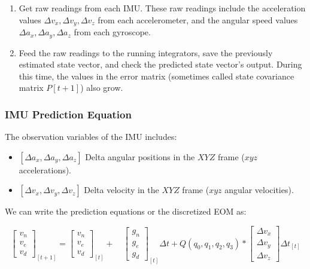 \begin{enumerate}
    \item Get raw readings from each IMU. These raw readings include the acceleration values $\Delta v_x, \Delta v_y, \Delta v_z$ from each accelerometer, and the angular speed values $\Delta a_x, \Delta a_y, \Delta a_z$ from each gyroscope.
    \item Feed the raw readings to the running integrators, save the previously estimated state vector, and check the predicted state vector's output. During this time, the values in the error matrix (sometimes called state covariance matrix $P[t+1]$) also grow.
\end{enumerate}

\subsubsection{IMU Prediction Equation}

The observation variables of the IMU includes:

\begin{itemize}
    \item $[\Delta a_x, \Delta a_y, \Delta a_z]$ Delta angular positions in the $XYZ$ frame ($xyz$ accelerations).
    \item $[\Delta v_x, \Delta v_y, \Delta v_z]$ Delta velocity in the $XYZ$ frame ($xyz$ angular velocities).
\end{itemize}

We can write the prediction equations or the discretized EOM as:

\begin{equation}
        \left[\begin{array}{c}
            v_n  \\
            v_e  \\
            v_d
        \end{array}\right]_{[t+1]}=\left[\begin{array}{c}
            v_n  \\
            v_e  \\
            v_d
        \end{array}\right]_{[t]}+\quad\left[\begin{array}{c}
            g_n  \\
            g_e  \\
            g_d
        \end{array}\right]_{[t]}{\Delta t}+Q(q_0,q_1,q_2,q_3)*\left[\begin{array}{c}
            \Delta v_x  \\
            \Delta v_y  \\
            \Delta v_z
        \end{array}\right]\Delta t_{[t]}
\end{equation}

